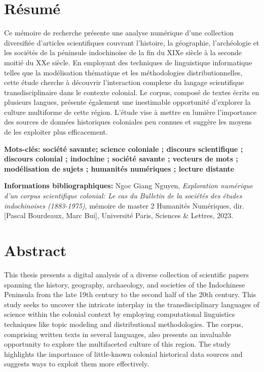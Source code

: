 \section*{Résumé}
Ce mémoire de recherche présente une analyse numérique d'une collection diversifiée d'articles scientifiques couvrant l'histoire, la géographie, l'archéologie et les sociétés de la péninsule indochinoise de la fin du XIXe siècle à la seconde moitié du XXe siècle. En employant des techniques de linguistique informatique telles que la modélisation thématique et les méthodologies distributionnelles, cette étude cherche à découvrir l'interaction complexe du langage scientifique transdisciplinaire dans le contexte colonial. Le corpus, composé de textes écrits en plusieurs langues, présente également une  inestimable opportunité d'explorer la culture multiforme de cette région. L’étude vise à mettre en lumière l’importance des sources de données historiques coloniales peu connues et suggère les moyens de les exploiter plus efficacement.


\medskip

\textbf{Mots-clés: société savante; science coloniale ; discours scientifique ; discours colonial ; indochine ; société savante ; vecteurs de mots ; modélisation de sujets ; humanités numériques ; lecture distante }

\textbf{Informations bibliographiques:} Ngoc Giang Nguyen, \textit{Exploration numérique d’un corpus
scientifique colonial: Le cas du Bulletin de la sociétés des études indochinoises (1883-1975)}, mémoire de master 2 \og Humanités Numériques\fg{}, dir. [Pascal Bourdeaux, Marc Bui], Université Paris, Sciences \& Lettres, 2023.



\section*{Abstract}
This thesis presents a digital analysis of a diverse collection of scientific papers spanning the history, geography, archaeology, and societies of the Indochinese Peninsula from the late 19th century to the second half of the 20th century. This study seeks to uncover the intricate interplay in the transdisciplinary languages of science within the colonial context by employing computational linguistics techniques like topic modeling and distributional methodologies. The corpus, comprising written texts in several languages, also presents an invaluable opportunity to explore the multifaceted culture of this region. The study highlights the importance of little-known colonial historical data sources and suggests ways to exploit them more effectively.


